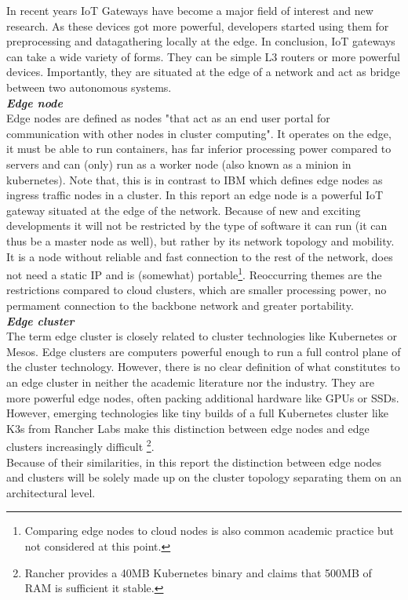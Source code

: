 In recent years IoT Gateways have become a major field of interest and new research. As these devices got more powerful, developers started using them for preprocessing and datagathering locally at the edge.
In conclusion, IoT gateways can take a wide variety of forms. They can be simple L3 routers or more powerful devices. Importantly, they are situated at the edge of a network and act as bridge between two autonomous systems.
\vspace*{0.5mm} \ \\
\textbf{\textit{Edge node}}\\
Edge nodes are defined as nodes "that act as an end user portal for communication with other
nodes in cluster computing"\cite{Whatised17:edgeNodeDef}.
It operates on the edge, it must be able to run containers, has far inferior processing power compared to servers and can (only) run as a worker node (also known as a minion in kubernetes)\cite{NodesKub7:edgeNodeMinion}. Note that, this is in contrast to IBM which defines edge nodes as ingress traffic nodes in a cluster\cite{IBMCloudEdgeNodes0:online}.
In this report an edge node is a powerful IoT gateway situated at the edge of the network. Because of new and exciting developments it will not be restricted by the type of software it can run (it can thus be a master node as well), but rather by its network topology and mobility. It is a node without reliable and fast connection to the rest of the network, does not need a static IP and is (somewhat) portable\footnote{Comparing edge nodes to cloud nodes is also common academic practice\cite{contstraintDevicesTerminology}  but not considered at this point.}.
Reoccurring themes are the restrictions compared to cloud clusters, which are smaller processing power,
no permament connection to the backbone network and greater portability.
\vspace{0.5mm} \ \\
\textbf{\textit{Edge cluster}}\\
The term edge cluster is closely related to cluster technologies like Kubernetes or Mesos.
Edge clusters are computers powerful enough to run a full control plane of the cluster technology.
However, there is no clear definition of what constitutes 
to an edge cluster in neither the academic literature nor the industry.
They are more powerful edge nodes, often packing additional hardware like GPUs or SSDs.
However, emerging technologies like tiny builds of a full Kubernetes cluster
like K3s from Rancher Labs\cite{k3sLight14:online} make this distinction 
between edge nodes and edge clusters
increasingly difficult
\footnote{Rancher provides a 40MB Kubernetes binary and claims that 500MB of RAM is sufficient 
it stable.}.\\
Because of their similarities, in this report the distinction between edge nodes and clusters will be solely
made up on the cluster topology separating them on an architectural level.

